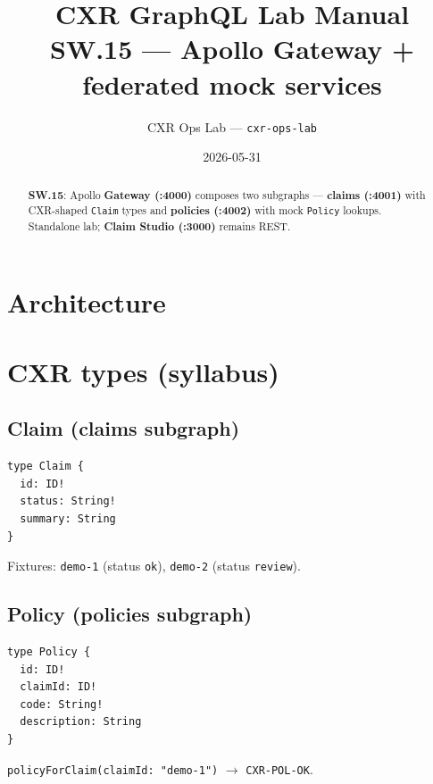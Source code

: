 \documentclass[11pt,a4paper]{report}
\title{CXR GraphQL Lab Manual\\
\large SW.15 --- Apollo Gateway + federated mock services}
\author{CXR Ops Lab --- \texttt{cxr-ops-lab}}
\date{2026-05-31}
\begin{document}
\maketitle
\begin{abstract}
\textbf{SW.15}: Apollo \textbf{Gateway (:4000)} composes two subgraphs ---
\textbf{claims (:4001)} with CXR-shaped \texttt{Claim} types and
\textbf{policies (:4002)} with mock \texttt{Policy} lookups.
Standalone lab; \textbf{Claim Studio (:3000)} remains REST.
\end{abstract}
\tableofcontents
\newpage

\chapter{Architecture}

\begin{center}
\end{center}

\chapter{CXR types (syllabus)}

\section{Claim (claims subgraph)}
\begin{lstlisting}[style=graphql]
type Claim {
  id: ID!
  status: String!
  summary: String
}
\end{lstlisting}
Fixtures: \texttt{demo-1} (status \texttt{ok}), \texttt{demo-2} (status \texttt{review}).

\section{Policy (policies subgraph)}
\begin{lstlisting}[style=graphql]
type Policy {
  id: ID!
  claimId: ID!
  code: String!
  description: String
}
\end{lstlisting}
\texttt{policyForClaim(claimId: "demo-1")} $\rightarrow$ \texttt{CXR-POL-OK}.
\end{document}
